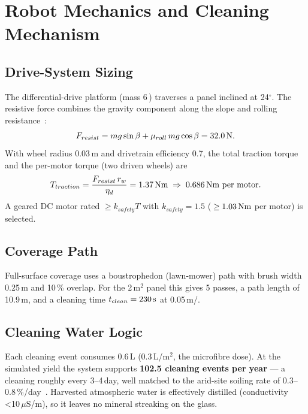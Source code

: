 \documentclass[12pt,a4paper]{report}
\newcommand{\num}[1]{#1}
\newcommand{\ang}[1]{#1\ensuremath{^{\circ}}}
\newcommand{\SI}[2]{#1\,\mbox{#2}}
\newcommand{\SIrange}[3]{#1--#2\,\mbox{#3}}
\newcommand{\per}{/}
\newcommand{\meter}{m}\newcommand{\metre}{m}
\newcommand{\micro}{\ensuremath{\mu}}
\newcommand{\liter}{L}\newcommand{\litre}{L}
\newcommand{\dy}{day}\newcommand{\yr}{yr}
\newcommand{\percent}{\%}
\newcommand{\siemens}{S}
\newcommand{\sqm}{m\ensuremath{^{2}}}
\begin{document}
\chapter{Robot Mechanics and Cleaning Mechanism}
\label{ch:mech}

\section{Drive-System Sizing}
The differential-drive platform (mass \SI{6}{\kilogram}) traverses a panel
inclined at \ang{24}. The resistive force combines the gravity component along
the slope and rolling resistance~\cite{siegwart2011mobilerobots}:
\begin{equation}
  F_{resist}=m g\sin\beta + \mu_{roll}\,m g\cos\beta = \SI{32.0}{\newton}.
  \label{eq:fresist}
\end{equation}
With wheel radius \SI{0.03}{\meter} and drivetrain efficiency \num{0.7}, the
total traction torque and the per-motor torque (two driven wheels) are
\begin{equation}
  T_{traction}=\frac{F_{resist}\,r_w}{\eta_d}=\SI{1.37}{\newton\meter}
  \;\Rightarrow\;\SI{0.686}{\newton\meter}\ \text{per motor}.
  \label{eq:torque}
\end{equation}
A geared DC motor rated $\ge k_{safety}T$ with $k_{safety}=1.5$
(\,$\ge\SI{1.03}{\newton\meter}$ per motor) is selected.

\section{Coverage Path}
Full-surface coverage uses a boustrophedon (lawn-mower) path with brush width
\SI{0.25}{\meter} and \SI{10}{\percent} overlap. For the \SI{2}{\sqm}
panel this gives \num{5} passes, a path length of \SI{10.9}{\meter}, and a
cleaning time $t_{clean}=\SI{230}{\second}$ at \SI{0.05}{\meter\per\second}.

\section{Cleaning Water Logic}
Each cleaning event consumes \SI{0.6}{\liter} (\SI{0.3}{\liter\per\sqm}, the
microfibre dose). At the simulated yield the system supports
\textbf{102.5 cleaning events per year} --- a cleaning roughly every
\SIrange{3}{4}{\dy}, well matched to the arid-site soiling rate of
\SIrange{0.3}{0.8}{\percent\per\dy}~\cite{kazem2023soiling}. Harvested
atmospheric water is effectively distilled (conductivity \SI{<10}{\micro\siemens\per\centi\meter}),
so it leaves no mineral streaking on the glass.
\end{document}
